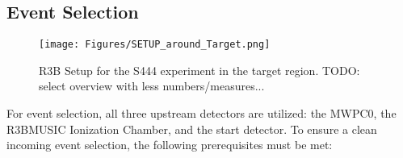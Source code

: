 \subsection{Event Selection}\label{subsec:event-sel}
\begin{figure}[htpb]
    \centering
    \texttt{[image: Figures/SETUP\_around\_Target.png]}
    \caption{
    R3B Setup for the S444 experiment in the target region. TODO: select overview with less numbers/measures...
    }
    \label{fig:setup_target_region}
\end{figure}

For event selection, all three upstream detectors are utilized: the MWPC0, the R3BMUSIC Ionization Chamber, and the start detector. To ensure a clean incoming event selection, the following prerequisites must be met:
